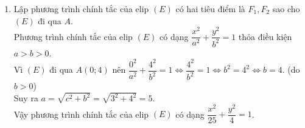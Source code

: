 \begin{bt}
{\begin{enumerate}
\[{\begin{array}{*{20}{c}}
	  {{{( - 3)}^2} + 6a + c = 0} \\
	  {{3^2} - 6a + c = 0}
	\end{array}} \right.\]
	\[ \Rightarrow \left\{ {\begin{array}{*{20}{c}}
	  {- 8b + c =  - 16} \\
	  {6a + c =  - 9} \\
	  { -6a  + c =  - 9}
	\end{array} \Rightarrow \left\{ {\begin{array}{*{20}{c}}
	  {a = 0} \\
	  {b =  \dfrac{7}{8}} \\
	  {c =  - 9}
	\end{array}} \right.} \right.\]
	Phương trình đường tròn $(C)$ có tâm $I(0 ; \dfrac{7}{8})$ và bán kính\\ $R=\sqrt{0^2+ \left( \dfrac{7}{8}\right) ^2+9}= \dfrac{25}{8}$:
		\[(C): x^2+(y- \dfrac{7}{8})^2= \dfrac{625}{64}\]
\item Lập phương trình chính tắc của elip $(E)$ có hai tiêu điểm là $F_{1}, F_{2}$ sao cho $(E)$ đi qua $A$.\\
	Phương trình chính tắc của elip $(E)$ có dạng $\dfrac{x^{2}}{a^2}+\dfrac{y^{2}}{b^2}=1$ thỏa điều kiện $a>b>0$.\\
	Vì $(E)$ đi qua $A(0;4)$ nên $\dfrac{0^{2}}{a^2}+\dfrac{4^{2}}{b^2}=1 \Leftrightarrow \dfrac{4^{2}}{b^2}=1 \Leftrightarrow b^2=4^2 \Leftrightarrow b= 4.$ (do $b>0 $)\\
	Suy ra $a=\sqrt{c^2+b^2}=\sqrt{3^2+4^2}=5$.\\
	Vậy phương trình chính tắc của elip $(E)$ có dạng $\dfrac{x^{2}}{25}+\dfrac{y^{2}}{4}=1$.
\end{enumerate}
}
\end{bt}
